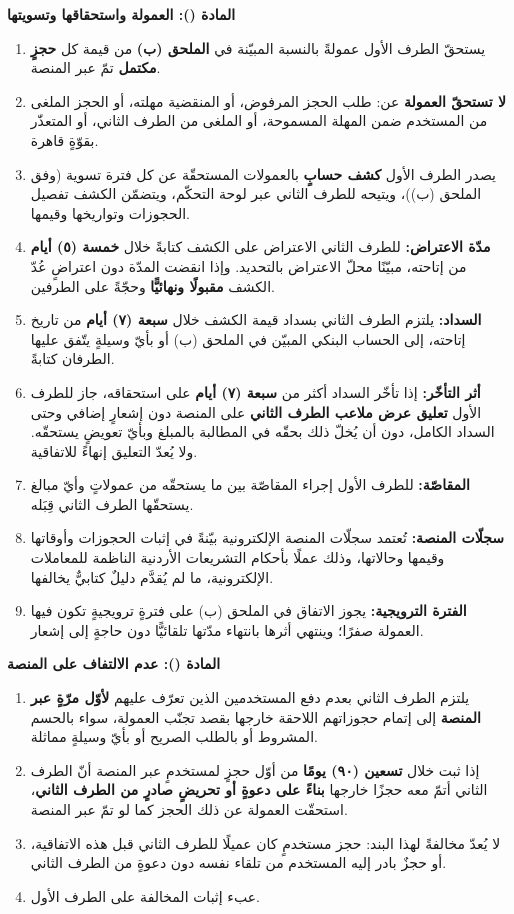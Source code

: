 \documentclass[12pt,a4paper]{article}
\newcounter{bndc}
\newcommand{\bnd}[1]{%
  \vspace{10pt}\par\noindent
  {\color{teal}\bfseries\large المادة (\arabic{bndc}): #1}%
  \stepcounter{bndc}%
  \par\vspace{2pt}\noindent{\color{rule}\rule{\linewidth}{0.6pt}}\par\vspace{4pt}%
}
\newcommand{\mlh}[1]{{\bfseries #1}}
\newenvironment{bnditems}
  {\begin{enumerate}[label=\arabic{bndc}.\arabic*,leftmargin=1.6em,itemsep=3pt,topsep=3pt]}
  {\end{enumerate}}
\begin{document}
\bnd{العمولة واستحقاقها وتسويتها}\label{art:comm}
\begin{bnditems}
  \item يستحقّ الطرف الأول عمولةً بالنسبة المبيّنة في \mlh{الملحق (ب)} من قيمة كل \mlh{حجزٍ مكتمل} تمّ عبر المنصة.
  \item \mlh{لا تستحقّ العمولة} عن: طلب الحجز المرفوض، أو المنقضية مهلته، أو الحجز الملغى من المستخدم ضمن المهلة المسموحة، أو الملغى من الطرف الثاني، أو المتعذّر بقوّةٍ قاهرة.
  \item يصدر الطرف الأول \mlh{كشف حسابٍ} بالعمولات المستحقّة عن كل فترة تسوية (وفق الملحق (ب))، ويتيحه للطرف الثاني عبر لوحة التحكّم، ويتضمّن الكشف تفصيل الحجوزات وتواريخها وقيمها.
  \item \mlh{مدّة الاعتراض:} للطرف الثاني الاعتراض على الكشف كتابةً خلال \mlh{خمسة (٥) أيام} من إتاحته، مبيّنًا محلّ الاعتراض بالتحديد. وإذا انقضت المدّة دون اعتراضٍ عُدّ الكشف \mlh{مقبولًا ونهائيًّا} وحجّةً على الطرفين.
  \item \mlh{السداد:} يلتزم الطرف الثاني بسداد قيمة الكشف خلال \mlh{سبعة (٧) أيام} من تاريخ إتاحته، إلى الحساب البنكي المبيّن في الملحق (ب) أو بأيّ وسيلةٍ يتّفق عليها الطرفان كتابةً.
  \item \mlh{أثر التأخّر:} إذا تأخّر السداد أكثر من \mlh{سبعة (٧) أيام} على استحقاقه، جاز للطرف الأول \mlh{تعليق عرض ملاعب الطرف الثاني} على المنصة دون إشعارٍ إضافي وحتى السداد الكامل، دون أن يُخلّ ذلك بحقّه في المطالبة بالمبلغ وبأيّ تعويضٍ يستحقّه. ولا يُعدّ التعليق إنهاءً للاتفاقية.
  \item \mlh{المقاصّة:} للطرف الأول إجراء المقاصّة بين ما يستحقّه من عمولاتٍ وأيّ مبالغ يستحقّها الطرف الثاني قِبَله.
  \item \mlh{سجلّات المنصة:} تُعتمد سجلّات المنصة الإلكترونية بيّنةً في إثبات الحجوزات وأوقاتها وقيمها وحالاتها، وذلك عملًا بأحكام التشريعات الأردنية الناظمة للمعاملات الإلكترونية، ما لم يُقدَّم دليلٌ كتابيٌّ يخالفها.
  \item \mlh{الفترة الترويجية:} يجوز الاتفاق في الملحق (ب) على فترةٍ ترويجيةٍ تكون فيها العمولة صفرًا؛ وينتهي أثرها بانتهاء مدّتها تلقائيًّا دون حاجةٍ إلى إشعار.
\end{bnditems}

\bnd{عدم الالتفاف على المنصة}\label{art:bypass}
\begin{bnditems}
  \item يلتزم الطرف الثاني بعدم دفع المستخدمين الذين تعرّف عليهم \mlh{لأوّل مرّةٍ عبر المنصة} إلى إتمام حجوزاتهم اللاحقة خارجها بقصد تجنّب العمولة، سواء بالحسم المشروط أو بالطلب الصريح أو بأيّ وسيلةٍ مماثلة.
  \item إذا ثبت خلال \mlh{تسعين (٩٠) يومًا} من أوّل حجزٍ لمستخدمٍ عبر المنصة أنّ الطرف الثاني أتمّ معه حجزًا خارجها \mlh{بناءً على دعوةٍ أو تحريضٍ صادرٍ من الطرف الثاني}، استحقّت العمولة عن ذلك الحجز كما لو تمّ عبر المنصة.
  \item لا يُعدّ مخالفةً لهذا البند: حجز مستخدمٍ كان عميلًا للطرف الثاني قبل هذه الاتفاقية، أو حجزٌ بادر إليه المستخدم من تلقاء نفسه دون دعوةٍ من الطرف الثاني.
  \item عبء إثبات المخالفة على الطرف الأول.
\end{bnditems}
\end{document}

